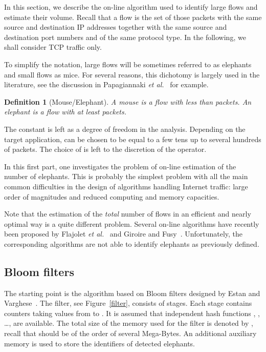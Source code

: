 \documentclass{amsart}
\newtheorem{definition}{Definition}
\def\etal{{\em et al.}}
\begin{document}
In  this section,  we  describe the  on-line algorithm  used  to identify  large  flows  and
estimate their  volume.  Recall  that a flow  is the  set of those  packets with  the same
source and  destination IP addresses  together with the  same source and  destination port
numbers and  of the same protocol  type. In the  following, we shall consider  TCP traffic
only.

To simplify the notation, large  flows will be sometimes referred to as elephants and small flows as
mice. For several reasons, this dichotomy is largely used in the literature, see the
discussion in Papagiannaki \etal~\cite{Taft} for example. 
\begin{definition}[Mouse/Elephant] A mouse is a flow with less than  packets. An elephant is a flow with at least  packets.
\end{definition}
The constant  is left as a degree of freedom in the analysis. Depending on the target
application,  can be chosen to be equal to a few tens up to several hundreds of
packets. The choice of  is left to the discretion of the operator. 

In this first  part, one investigates the  problem of on-line estimation of  the number of
elephants. This is probably the simplest  problem with all the main common difficulties in the design of  algorithms  handling Internet traffic: large order  of
 magnitudes and
reduced computing and memory capacities.

Note  that the estimation of  the {\em total} number of flows in  an
efficient and nearly optimal way is a quite different problem. Several
on-line algorithms have  recently    been
proposed by  Flajolet \etal~\cite{Flajolet}   and  Giroire   and  Fusy~\cite{Giroire}.
Unfortunately,  the corresponding algorithms are not able to identify
elephants as previously defined.

\subsection{Bloom filters}

The starting point is the algorithm  based  on  Bloom filters designed
by Estan  and
Varghese~\cite{Varghese}.   The filter, see Figure~\ref{filter}, consists of 
stages. Each stage   contains  counters taking values from  to . It is
assumed  that  independent hash functions , , \ldots,  are
available. The total size of the memory used for the filter is denoted by , recall that
 should be of the order of several Mega-Bytes.  An additional  auxiliary  memory is
used to store the identifiers  of detected elephants.  
\end{document}
